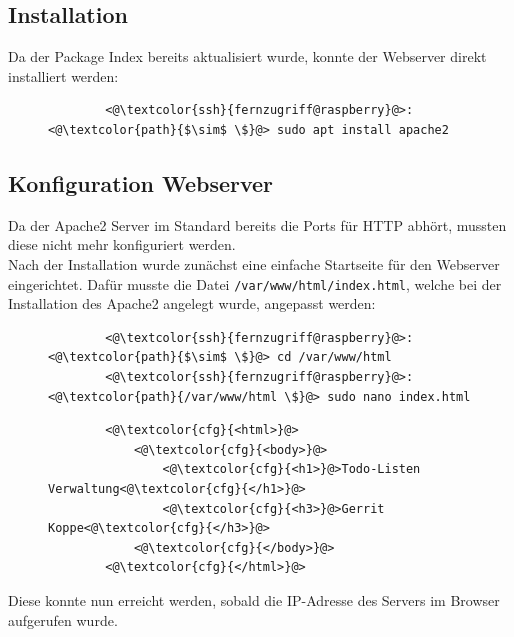 \documentclass[a4paper, 12pt]{scrartcl}
\begin{document}
\subsection{Installation}
Da der Package Index bereits aktualisiert wurde, konnte der Webserver direkt installiert werden:
\begin{figure}[H]
    \begin{mdframed}[backgroundcolor=bbg]
        \begin{lstlisting}
        <@\textcolor{ssh}{fernzugriff@raspberry}@>:<@\textcolor{path}{$\sim$ \$}@> sudo apt install apache2
        \end{lstlisting}
    \end{mdframed}
    \label{lst:apache_install}
\end{figure}


\subsection{Konfiguration Webserver}
Da der Apache2 Server im Standard bereits die Ports für HTTP abhört, mussten diese nicht mehr konfiguriert werden.
\\
Nach der Installation wurde zunächst eine einfache Startseite für den Webserver eingerichtet. Dafür musste die Datei
\lstinline[basicstyle={\small\ttfamily\color{black}}]|/var/www/html/index.html|, welche bei der Installation des Apache2 angelegt wurde, angepasst
werden:
\begin{figure}[H]
    \begin{mdframed}[backgroundcolor=bbg]
        \begin{lstlisting}
        <@\textcolor{ssh}{fernzugriff@raspberry}@>:<@\textcolor{path}{$\sim$ \$}@> cd /var/www/html
        <@\textcolor{ssh}{fernzugriff@raspberry}@>:<@\textcolor{path}{/var/www/html \$}@> sudo nano index.html
        \end{lstlisting}
    \end{mdframed}
    \label{lst:index_nano}
\end{figure}
\begin{figure}[H]
    \begin{mdframed}[backgroundcolor=bbg]
        \begin{lstlisting}
        <@\textcolor{cfg}{<html>}@>
            <@\textcolor{cfg}{<body>}@>
                <@\textcolor{cfg}{<h1>}@>Todo-Listen Verwaltung<@\textcolor{cfg}{</h1>}@>
                <@\textcolor{cfg}{<h3>}@>Gerrit Koppe<@\textcolor{cfg}{</h3>}@>
            <@\textcolor{cfg}{</body>}@>
        <@\textcolor{cfg}{</html>}@>
        \end{lstlisting}
    \end{mdframed}
    \label{lst:index_apache2}
\end{figure}
Diese konnte nun erreicht werden, sobald die IP-Adresse des Servers im Browser aufgerufen wurde.
\end{document}
